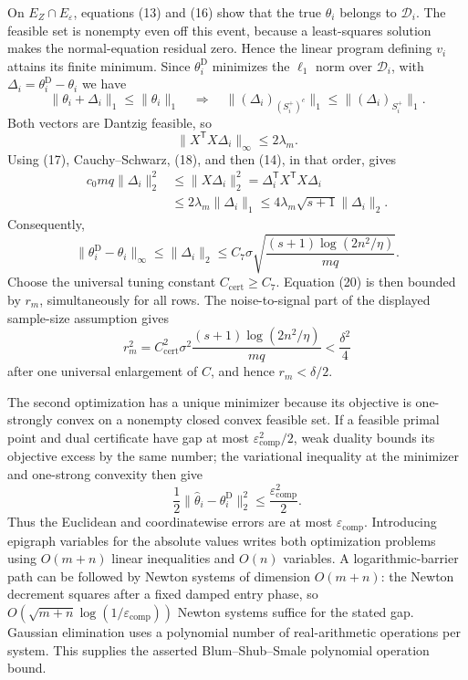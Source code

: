 On \(E_Z\cap E_\varepsilon\), equations (13) and (16) show that the true \(\theta_i\) belongs to \(\mathcal D_i\).  The feasible set is nonempty even off this event, because a least-squares solution makes the normal-equation residual zero.  Hence the linear program defining \(v_i\) attains its finite minimum.  Since \(\theta_i^{\mathrm D}\) minimizes the \(\ell_1\) norm over \(\mathcal D_i\), with \(\Delta_i=\theta_i^{\mathrm D}-\theta_i\) we have
\[
 \lVert\theta_i+\Delta_i\rVert_1\le\lVert\theta_i\rVert_1
 \quad\Longrightarrow\quad
 \lVert(\Delta_i)_{(S_i^+)^c}\rVert_1\le\lVert(\Delta_i)_{S_i^+}\rVert_1.                  \tag{17}
\]
Both vectors are Dantzig feasible, so
\[
 \lVert X^{\mathsf T}X\Delta_i\rVert_\infty\le2\lambda_m.           \tag{18}
\]
Using (17), Cauchy--Schwarz, (18), and then (14), in that order, gives
\[
 \begin{aligned}
 c_0mq\lVert\Delta_i\rVert_2^2
 &\le\lVert X\Delta_i\rVert_2^2
 =\Delta_i^{\mathsf T}X^{\mathsf T}X\Delta_i\\
 &\le2\lambda_m\lVert\Delta_i\rVert_1
 \le4\lambda_m\sqrt{s+1}\lVert\Delta_i\rVert_2.
 \end{aligned}                                                        \tag{19}
\]
Consequently,
\[
 \lVert\theta_i^{\mathrm D}-\theta_i\rVert_\infty
 \le\lVert\Delta_i\rVert_2
 \le C_7\sigma\sqrt{\frac{(s+1)\log(2n^2/\eta)}{mq}}.                \tag{20}
\]
Choose the universal tuning constant \(C_{\mathrm{cert}}\ge C_7\).  Equation (20) is then bounded by \(r_m\), simultaneously for all rows.  The noise-to-signal part of the displayed sample-size assumption gives
\[
 r_m^2=C_{\mathrm{cert}}^2\sigma^2
 \frac{(s+1)\log(2n^2/\eta)}{mq}<\frac{\delta^2}{4}                    \tag{21}
\]
after one universal enlargement of \(C\), and hence \(r_m<\delta/2\).

The second optimization has a unique minimizer because its objective is one-strongly convex on a nonempty closed convex feasible set.  If a feasible primal point and dual certificate have gap at most \(\varepsilon_{\mathrm{comp}}^2/2\), weak duality bounds its objective excess by the same number; the variational inequality at the minimizer and one-strong convexity then give
\[
 \frac12\lVert\widehat\theta_i-\theta_i^{\mathrm D}\rVert_2^2
 \le \frac{\varepsilon_{\mathrm{comp}}^2}{2}.                         \tag{22}
\]
Thus the Euclidean and coordinatewise errors are at most \(\varepsilon_{\mathrm{comp}}\).  Introducing epigraph variables for the absolute values writes both optimization problems using \(O(m+n)\) linear inequalities and \(O(n)\) variables.  A logarithmic-barrier path can be followed by Newton systems of dimension \(O(m+n)\): the Newton decrement squares after a fixed damped entry phase, so \(O(\sqrt{m+n}\log(1/\varepsilon_{\mathrm{comp}}))\) Newton systems suffice for the stated gap.  Gaussian elimination uses a polynomial number of real-arithmetic operations per system.  This supplies the asserted Blum--Shub--Smale polynomial operation bound.

